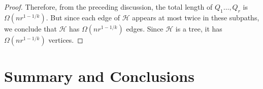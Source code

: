 \documentclass{patmorin}
\begin{document}
\begin{proof}
Therefore, from the preceding discussion, the total length of $Q_1\ldots,Q_{r}$ is $\Omega(nr^{1-1/k})$.  But since each edge of $\mathcal H$ appears at most twice in these subpaths, we conclude that $\mathcal H$ has $\Omega(nr^{1-1/k})$ edges.  Since $\mathcal H$ is a tree, it has $\Omega(nr^{1-1/k})$ vertices.
\end{proof}

\section{Summary and Conclusions}\label{section:Conclusions}



\end{document}
